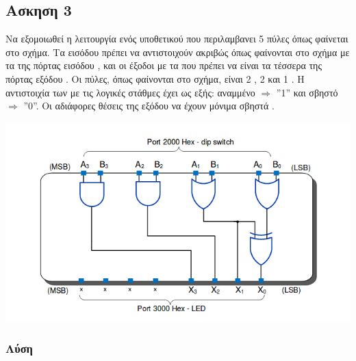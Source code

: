 \newpage \subsection*{Ασκηση 3}

Να εξομοιωθεί η λειτουργία ενός υποθετικού  που περιλαμβανει 5 πύλες όπως φαίνεται στο σχήμα. Τα  εισόδου
πρέπει να αντιστοιχούν ακριβώς όπως φαίνονται στο σχήμα με τα  της πόρτας εισόδου , και οι 
έξοδοι με τα  που πρέπει να είναι τα τέσσερα  της πόρτας εξόδου . Οι πύλες, όπως φαίνονται
στο σχήμα, είναι 2 , 2  και 1 . Η αντιστοιχία των  με τις λογικές στάθμες έχει ως εξής:
αναμμένο  $\Rightarrow$ ''1'' και σβηστό  $\Rightarrow$ ''0''. Οι αδιάφορες θέσεις της εξόδου να έχουν μόνιμα σβηστά .

\begin{center}
\includegraphics[width=.5\textwidth]{./ex3/Selection_007.png}
\end{center}

\subsubsection*{Λύση}

\inputminted{text}{./ex3/ex3.8085}



